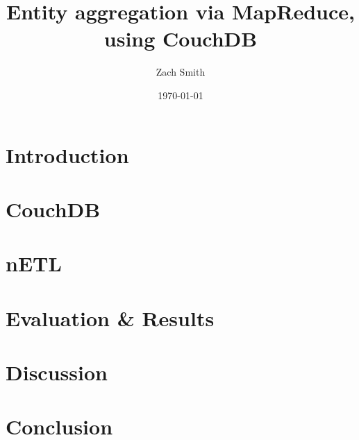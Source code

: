 \documentclass[
    parskip=full,
    a4paper
]{scrartcl}
\title{Entity aggregation via MapReduce, using CouchDB}
\author{Zach Smith}
\date{\today}
\begin{document}
\maketitle
\thispagestyle{empty}

\begin{abstract}
    
\end{abstract}
\newpage

\tableofcontents
\newpage

\section{Introduction}




\section{CouchDB}


\section{nETL}




\section{Evaluation \& Results}










% 
% 

\section{Discussion}


\section{Conclusion}



\newpage
\end{document}
